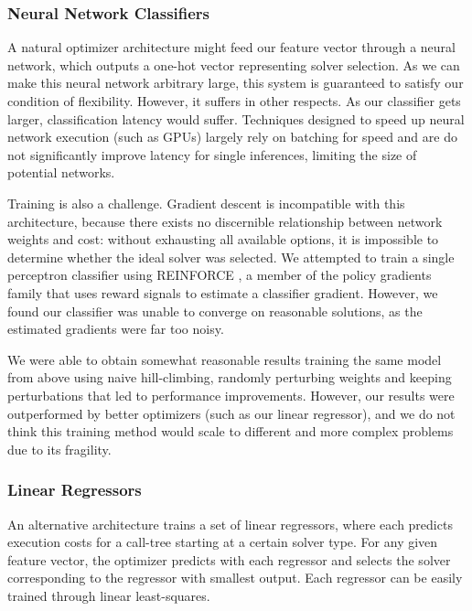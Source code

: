 \documentclass{article}
\begin{document}
\subsubsection{Neural Network Classifiers}

A natural optimizer architecture might feed our feature vector through a neural network, which outputs a one-hot vector representing solver selection. As we can make this neural network arbitrary large, this system is guaranteed to satisfy our condition of flexibility. However, it suffers in other respects.  As our classifier gets larger, classification latency would suffer.  Techniques designed to speed up neural network execution (such as GPUs) largely rely on batching for speed and are do not significantly improve latency for single inferences, limiting the size of potential networks.

Training is also a challenge. Gradient descent is incompatible with this architecture, because there exists no discernible relationship between network weights and cost: without exhausting all available options, it is impossible to determine whether the ideal solver was selected.  We attempted to train a single perceptron classifier using REINFORCE \cite{reinforce}, a member of the policy gradients family that uses reward signals to estimate a classifier gradient.  However, we found our classifier was unable to converge on reasonable solutions, as the estimated gradients were far too noisy.

We were able to obtain somewhat reasonable results training the same model from above using naive hill-climbing, randomly perturbing weights and keeping perturbations that led to performance improvements.  However, our results were outperformed by better optimizers (such as our linear regressor), and we do not think this training method would scale to different and more complex problems due to its fragility.

\subsubsection{Linear Regressors}

An alternative architecture trains a set of linear regressors, where each predicts execution costs for a call-tree starting at a certain solver type.  For any given feature vector, the optimizer predicts with each regressor and selects the solver corresponding to the regressor with smallest output. Each regressor can be easily trained through linear least-squares.
\end{document}
